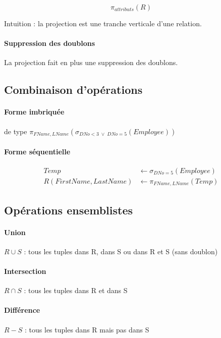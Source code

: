 \documentclass[a4paper]{article}
\begin{document}
  $$ \pi_{attributs}(R) $$

  Intuition : la projection est une tranche verticale d'une relation.

  \paragraph{Suppression des doublons}
  La projection fait en plus une suppression des doublons.

  \subsection{Combinaison d'opérations}

  \paragraph{Forme imbriquée} de type $ \pi_{FName, LName}(\sigma_{DNo<3\; \lor\; DNo=5 }(Employee))$

  \paragraph{Forme séquentielle}
  \begin{align*}
    Temp &\leftarrow \sigma_{DNo=5}(Employee)\\
    R(FirstName, LastName) &\leftarrow \pi_{FName, LName}(Temp)
  \end{align*}

  \subsection{Opérations ensemblistes}

  \paragraph{Union} $R \cup S$ : tous les tuples dans R, dans S ou dans R et S (sans doublon)

  \paragraph{Intersection} $R \cap S$ : tous les tuples dans R et dans S

  \paragraph{Différence} $R - S$ : tous les tuples dans R mais pas dans S\\
\end{document}
